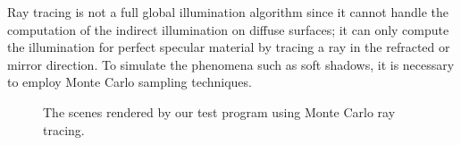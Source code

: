 Ray tracing is not a full global illumination algorithm since it cannot handle the computation of the indirect illumination on diffuse surfaces; it can only compute the illumination for perfect specular material by tracing a ray in the refracted or mirror direction. To simulate the phenomena such as soft shadows, it is necessary to employ Monte Carlo sampling techniques\cite{Kajiya:1986:RE:15922.15902}.

\begin{figure}[htp]
\begin{center}
    \renewcommand{\thefigure}{\thechapter.\arabic{figure}}
    \caption[Test Scenes Rendered Using Monte-Carlo Ray Tracing]{The scenes rendered by our test program using Monte Carlo ray tracing. }
    \label{fig:rt_images}
\end{center}
\end{figure}

